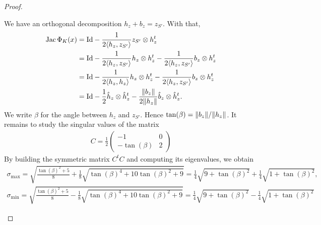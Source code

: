 \documentclass[10pt,a4paper]{article}
\begin{document}
\begin{proof}
\begin{itemize}
        We have an orthogonal decomposition $h_{z} + b_{z} = z_{S'}$.
        With that,
        \begin{align*}
            \operatorname{{\rm Jac}} \Phi_{K}(x)
            &=
            {\rm Id} 
            - 
            \frac{1}{ 2 \langle h_{z},z_{S'}\rangle }  
            z_{S'} \otimes h_{z}^{t}
            \\
            &=
            {\rm Id} 
            - 
            \frac{1}{ 2 \langle h_{z},z_{S'}\rangle } 
            h_{z} \otimes h_{z}^{t}
            - 
            \frac{1}{ 2 \langle h_{z},z_{S'}\rangle } 
            b_{z} \otimes h_{z}^{t}
            \\
            &=
            {\rm Id} 
            - 
            \frac{1}{ 2 \langle h_{z}, h_{z}\rangle } 
            h_{z} \otimes h_{z}^{t}
            - 
            \frac{1}{ 2 \langle h_{z},z_{S'}\rangle } 
            b_{z} \otimes h_{z}^{t}
            \\
            &=
            {\rm Id} 
            - 
            \frac{1}{ 2 } 
            \hat h_{z} \otimes \hat h_{z}^{t}
            - 
            \frac{ \|  b_{z}  \| }{ 2 \|  h_{z}  \| } 
            \hat b_{z} \otimes \hat h_{z}^{t}
            .
        \end{align*}
        We write $\beta$ for the angle between $h_{z}$ and $z_{S'}$.
        Hence $\tan(\beta) = \|  b_{z}  \| / \|  h_{z}  \|$. It remains to study the singular values of the matrix 
        \begin{align*}
            C 
            = 
            \frac 1 2 
            \begin{pmatrix}
                -1 & 0 
                \\
                -\tan(\beta) & 2 
            \end{pmatrix}
        \end{align*}
        By building the symmetric matrix $C^{t} C$ and computing its eigenvalues, we obtain 
        \begin{align*}
            \sigma_{\max} 
            = 
            \sqrt{ \frac{ \tan(\beta)^{2} + 5 }{8} + \frac 1 8 \sqrt{ \tan(\beta)^{4} + 10 \tan(\beta)^{2} + 9 } }
            =
            \frac 1 4 \sqrt{ 9 + \tan(\beta)^2 } + \frac 1 4 \sqrt{ 1 + \tan(\beta)^2 }
            ,
            \\
            \sigma_{\min} 
            = 
            \sqrt{ \frac{ \tan(\beta)^{2} + 5 }{8} - \frac 1 8 \sqrt{ \tan(\beta)^{4} + 10 \tan(\beta)^{2} + 9 } }
            =
            \frac 1 4 \sqrt{ 9 + \tan(\beta)^2 } - \frac 1 4 \sqrt{ 1 + \tan(\beta)^2 }

\end{align*}
\end{itemize}
\end{proof}
\end{document}
